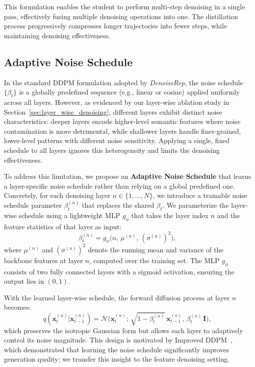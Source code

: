 \documentclass[conference]{IEEEtran}
\begin{document}
{This formulation enables the student to perform multi-step denoising in a single pass, effectively fusing multiple denoising operations into one. The distillation process progressively compresses longer trajectories into fewer steps, while maintaining denoising effectiveness.



{\color{red}
\subsection{Adaptive Noise Schedule}
\label{sec:method_adaptive}

In the standard DDPM formulation adopted by \textit{DenoiseRep}, the noise schedule $\{\beta_t\}$ is a globally predefined sequence (e.g., linear or cosine) applied uniformly across all layers. However, as evidenced by our layer-wise ablation study in Section~\ref{sec:layer_wise_denoising}, different layers exhibit distinct noise characteristics: deeper layers encode higher-level semantic features where noise contamination is more detrimental, while shallower layers handle finer-grained, lower-level patterns with different noise sensitivity. Applying a single, fixed schedule to all layers ignores this heterogeneity and limits the denoising effectiveness.

To address this limitation, we propose an \textbf{Adaptive Noise Schedule} that learns a layer-specific noise schedule rather than relying on a global predefined one. Concretely, for each denoising layer $n \in \{1, \ldots, N\}$, we introduce a trainable noise schedule parameter $\beta_t^{(n)}$ that replaces the shared $\beta_t$. We parameterize the layer-wise schedule using a lightweight MLP $g_\phi$ that takes the layer index $n$ and the feature statistics of that layer as input:
\begin{equation}
\beta_t^{(n)} = g_\phi\bigl(n,\, \mu^{(n)},\, (\sigma^{(n)})^2\bigr),
\label{eq:adaptive_beta}
\end{equation}
where $\mu^{(n)}$ and $(\sigma^{(n)})^2$ denote the running mean and variance of the backbone features at layer $n$, computed over the training set. The MLP $g_\phi$ consists of two fully connected layers with a sigmoid activation, ensuring the output lies in $(0, 1)$.

With the learned layer-wise schedule, the forward diffusion process at layer $n$ becomes:
\begin{equation}
q(\mathbf{x}_t^{(n)} | \mathbf{x}_{t-1}^{(n)}) = \mathcal{N}\bigl(\mathbf{x}_t^{(n)};\, \sqrt{1 - \beta_t^{(n)}}\,\mathbf{x}_{t-1}^{(n)},\, \beta_t^{(n)}\, \mathbf{I}\bigr),
\label{eq:adaptive_forward}
\end{equation}
which preserves the isotropic Gaussian form but allows each layer to adaptively control its noise magnitude. This design is motivated by Improved DDPM~\cite{nichol2021improved}, which demonstrated that learning the noise schedule significantly improves generation quality; we transfer this insight to the feature denoising setting.

}}
\end{document}
